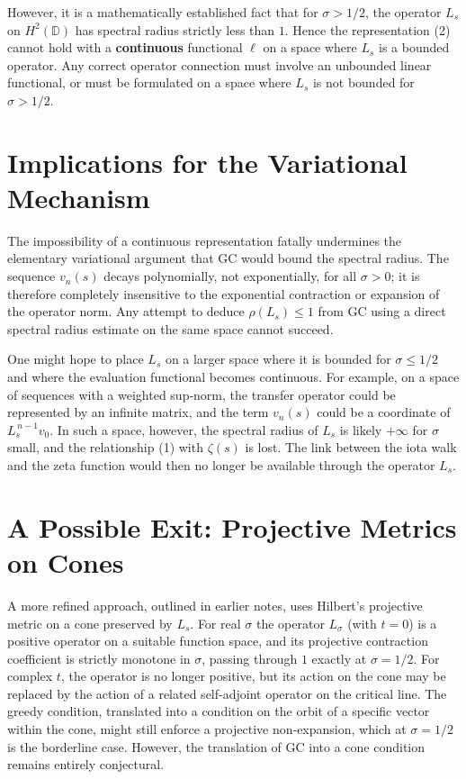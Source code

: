 \documentclass[11pt,a4paper]{article}
\begin{document}
However, it is a mathematically established fact that for \(\sigma > 1/2\), the operator \(L_s\) on \(H^2(\mathbb{D})\) has spectral radius strictly less than \(1\).  Hence the representation (2) cannot hold with a \textbf{continuous} functional \(\ell\) on a space where \(L_s\) is a bounded operator.  Any correct operator connection must involve an unbounded linear functional, or must be formulated on a space where \(L_s\) is not bounded for \(\sigma > 1/2\).

\section{Implications for the Variational Mechanism}
The impossibility of a continuous representation fatally undermines the elementary variational argument that GC would bound the spectral radius.  The sequence \(v_n(s)\) decays polynomially, not exponentially, for all \(\sigma > 0\); it is therefore completely insensitive to the exponential contraction or expansion of the operator norm.  Any attempt to deduce \(\rho(L_s) \le 1\) from GC using a direct spectral radius estimate on the same space cannot succeed.

One might hope to place \(L_s\) on a larger space where it is bounded for \(\sigma \le 1/2\) and where the evaluation functional becomes continuous.  For example, on a space of sequences with a weighted sup‑norm, the transfer operator could be represented by an infinite matrix, and the term \(v_n(s)\) could be a coordinate of \(L_s^{\,n-1} v_0\).  In such a space, however, the spectral radius of \(L_s\) is likely \(+\infty\) for \(\sigma\) small, and the relationship (1) with \(\zeta(s)\) is lost.  The link between the iota walk and the zeta function would then no longer be available through the operator \(L_s\).

\section{A Possible Exit: Projective Metrics on Cones}
A more refined approach, outlined in earlier notes, uses Hilbert's projective metric on a cone preserved by \(L_s\).  For real \(\sigma\) the operator \(L_\sigma\) (with \(t=0\)) is a positive operator on a suitable function space, and its projective contraction coefficient is strictly monotone in \(\sigma\), passing through \(1\) exactly at \(\sigma = 1/2\).  For complex \(t\), the operator is no longer positive, but its action on the cone may be replaced by the action of a related self‑adjoint operator on the critical line.  The greedy condition, translated into a condition on the orbit of a specific vector within the cone, might still enforce a projective non‑expansion, which at \(\sigma = 1/2\) is the borderline case.  However, the translation of GC into a cone condition remains entirely conjectural.
\end{document}
